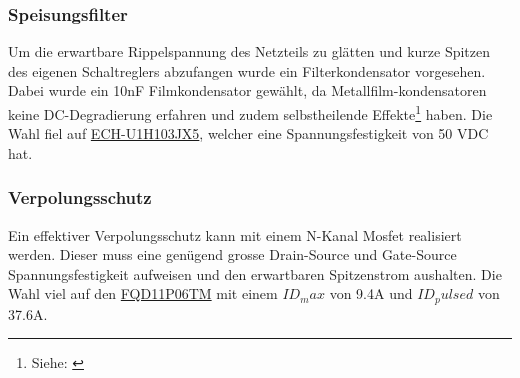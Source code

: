 \subsubsection{Speisungsfilter}
Um die erwartbare Rippelspannung des Netzteils zu glätten und kurze Spitzen des eigenen Schaltreglers abzufangen wurde ein Filterkondensator vorgesehen. Dabei wurde ein 10nF Filmkondensator gewählt, da Metallfilm-kondensatoren keine DC-Degradierung erfahren und zudem selbstheilende Effekte\footnote{Siehe: \cite{healingofhilmcaps}} haben. Die Wahl fiel auf \href{https://industrial.panasonic.com/ww/products/pt/film-cap-electroequip/models/ECHU1H103JX5}{ECH-U1H103JX5}, welcher eine Spannungsfestigkeit von 50 VDC hat.
\subsubsection{Verpolungsschutz}
Ein effektiver Verpolungsschutz kann mit einem N-Kanal Mosfet realisiert werden. Dieser muss eine genügend grosse Drain-Source und Gate-Source Spannungsfestigkeit aufweisen und den erwartbaren Spitzenstrom aushalten. Die Wahl viel auf den \href{https://www.onsemi.com/pdf/datasheet/fqu11p06-d.pdf}{FQD11P06TM} mit einem $ID_max$ von 9.4A und $ID_pulsed$ von 37.6A.